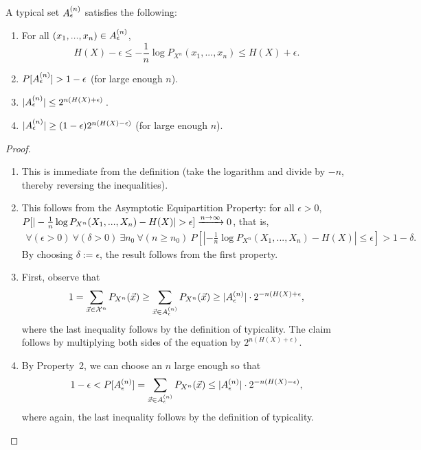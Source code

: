 \begin{proposition}\label{prop:typset-properties}
A typical set $A_{\epsilon}^{(n)}$ satisfies the following:
\begin{enumerate}
\item For all $(x_1, ..., x_n) \in A_{\epsilon}^{(n)}$, \[H(X) - \epsilon \leq - \frac{1}{n} \log P_{X^n}(x_1, ..., x_n) \leq H(X) + \epsilon.\]
\item $P[A_{\epsilon}^{(n)}] > 1 - \epsilon$ (for large enough $n$).
\item $|A_{\epsilon}^{(n)}| \leq 2^{n(H(X) + \epsilon)} \,$.
\item $|A_{\epsilon}^{(n)}| \geq (1-\epsilon) 2^{n(H(X) - \epsilon)}$ (for large enough $n$).
\end{enumerate}
\end{proposition}
\begin{proof}\ 
\begin{enumerate}
\item This is immediate from the definition (take the logarithm and
  divide by $-n$, thereby reversing the inequalities).
\item This follows from the Asymptotic Equipartition Property: for all $\epsilon > 0$, $P[|-\frac{1}{n} \log P_{X^n}(X_1, ..., X_n) - H(X)| > \epsilon] \xrightarrow{n \to \infty} 0$, that is,
\begin{align}\forall (\epsilon > 0) \ \forall (\delta > 0) \ \exists n_0 \ \forall (n \geq n_0) \ P[|-\frac{1}{n} \log P_{X^n}(X_1, ..., X_n) - H(X)| \leq \epsilon] > 1 - \delta.
\end{align}
By choosing $\delta := \epsilon$, the result follows from the first property.
\item First, observe that
\begin{align}
1 = \sum_{\vec{x} \in \mathcal{X}^n} P_{X^n}(\vec{x}) \geq \sum_{\vec{x} \in A_{\epsilon}^{(n)}} P_{X^n}(\vec{x}) \geq |A_{\epsilon}^{(n)}| \cdot 2^{-n(H(X) + \epsilon},
\end{align}
where the last inequality follows by the definition of typicality. The claim follows by multiplying both sides of the equation by $2^{n(H(X) + \epsilon)}$.
\item By Property~2, we can choose an $n$ large enough so that
\begin{align}
1 - \epsilon < P[A_{\epsilon}^{(n)}] = \sum_{\vec{x} \in A_{\epsilon}^{(n)}} P_{X^n}(\vec{x}) \leq |A_{\epsilon}^{(n)}| \cdot 2^{-n(H(X)-\epsilon)},
\end{align}
where again, the last inequality follows by the definition of typicality.
\end{enumerate}
\end{proof}


